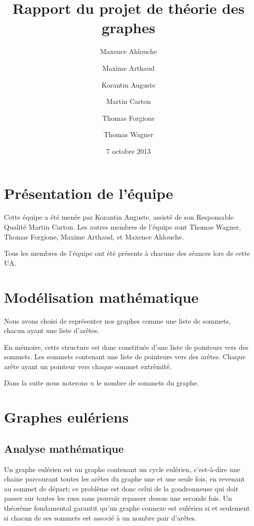 \documentclass{scrartcl}
\begin{document}
\title{Rapport du projet de théorie des graphes}
\author{Maxence Ahlouche \and Maxime Arthaud \and Korantin Auguste
          \and Martin Carton \and Thomas Forgione \and Thomas Wagner}
\date{7 octobre 2013}
\maketitle
\newpage
\tableofcontents
\newpage

\section{Présentation de l'équipe}
  Cette équipe a été menée par Korantin Auguste, assisté de son Responsable
  Qualité Martin Carton. Les autres membres de l'équipe sont Thomas Wagner,
  Thomas Forgione, Maxime Arthaud, et Maxence Ahlouche.
  
  Tous les membres de l'équipe ont été présents à chacune des séances lors de
  cette UA.

\section{Modélisation mathématique}
  Nous avons choisi de représenter nos graphes comme une liste de sommets,
  chacun ayant une liste d'arêtes.

  En mémoire, cette structure est donc constituée d'une liste de pointeurs
  vers des sommets. Les sommets contenant une liste de pointeurs vers des
  arêtes. Chaque arête ayant un pointeur vers chaque sommet extrêmité.

  Dans la suite nous noterons $n$ le nombre de sommets du graphe.

\section{Graphes eulériens}
  \subsection{Analyse mathématique}
    Un graphe eulérien est un graphe contenant un cycle eulérien, c'est-à-dire
    une chaine parcourant toutes les arêtes du graphe une et une seule fois, en
    revenant au sommet de départ; ce problème est donc celui de la goudronneuse
    qui doit passer sur toutes les rues sans pouvoir repasser dessus une
    seconde fois. Un théorème fondamental garantit qu'un graphe connexe est
    eulérien si et seulement si chacun de ses sommets est associé à un nombre
    pair d'arêtes.
\end{document}
